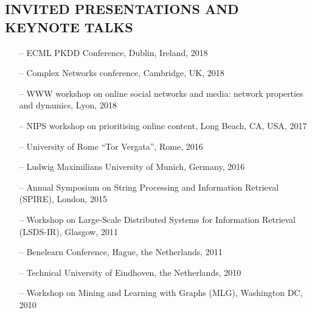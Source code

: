 \documentclass[a4paper,11pt]{res}
\begin{document}
\begin{resume}
\section{{\small INVITED PRESENTATIONS AND KEYNOTE TALKS}}
\begin{itemize}
\setlength{\itemsep}{0pt}
\item [--]
ECML PKDD Conference, Dublin, Ireland, 2018
\item [--]
Complex Networks conference, Cambridge, UK, 2018
\item [--]
WWW workshop on 
online social networks and media:
network properties and dynamics, Lyon, 2018
\item [--]
NIPS workshop on prioritising online content, Long Beach, CA, USA, 2017
\item [--]
University of Rome ``Tor Vergata'',  Rome, 2016
\item [--]
Ludwig Maximilians University of Munich, Germany, 2016 
\item[--]
Annual Symposium on String Processing and Information Retrieval (SPIRE), London, 2015	
\item [--]
Workshop on Large-Scale Distributed Systems for Information Retrieval (LSDS-IR), Glasgow, %
2011 
\item [--]
Benelearn Conference, Hague, the Netherlands, %
2011
\item [--]
Technical University of Eindhoven, the Netherlands, %
2010
\item [--]
Workshop on Mining and Learning with Graphs (MLG), Washington DC, %
2010
\iffalse
\item [--]	
Workshop on Distributed Agent-based
Retrieval Tools (DART), %
Italy, {2008}
\item[--]
Workshop on Mining Massive Data Sets for Security
(MMDSS), Italy, {2007}
\fi
\end{itemize}



\end{resume}
\end{document}
